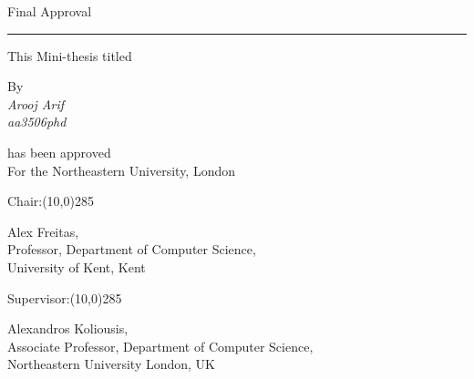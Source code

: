 
\begin{center}

\Large Final Approval
\end{center}
\noindent\rule{15.5cm}{3pt}

\begin{center}
\normalsize
 This Mini-thesis titled\\
\end{center}


\begin{center}
\large {}
\end{center}

\vfill
\begin{center}
By\\
\emph{Arooj Arif\\
aa3506phd}
\end{center}


\begin{center}\normalsize
has been approved\\
For the Northeastern University, London
\end{center}

%


\vfill
\normalsize
Chair:\line(10,0){285}
\vspace{-0.50cm}
\begin{center}\normalsize
    Alex Freitas,\\
    Professor, Department of Computer Science,\\
    University of Kent, Kent\\

\end{center}

\vfill
\normalsize
Supervisor:\line(10,0){285}
\vspace{-0.50cm}
\begin{center}\normalsize
Alexandros Koliousis,\\
Associate Professor, Department of Computer Science,\\
Northeastern University London, UK
\end{center}

